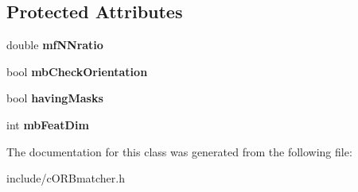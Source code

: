 \subsection*{Protected Attributes}
\begin{DoxyCompactItemize}
\item 
double {\bfseries mf\+N\+Nratio}\hypertarget{classMultiColSLAM_1_1cORBmatcher_a245c998d51b001aeae58ef86315be170}{}\label{classMultiColSLAM_1_1cORBmatcher_a245c998d51b001aeae58ef86315be170}

\item 
bool {\bfseries mb\+Check\+Orientation}\hypertarget{classMultiColSLAM_1_1cORBmatcher_a341d3d54041e8eebb463697c084ba2a1}{}\label{classMultiColSLAM_1_1cORBmatcher_a341d3d54041e8eebb463697c084ba2a1}

\item 
bool {\bfseries having\+Masks}\hypertarget{classMultiColSLAM_1_1cORBmatcher_ae5f0f1f2e7d5213fb21e9a6ef15bd297}{}\label{classMultiColSLAM_1_1cORBmatcher_ae5f0f1f2e7d5213fb21e9a6ef15bd297}

\item 
int {\bfseries mb\+Feat\+Dim}\hypertarget{classMultiColSLAM_1_1cORBmatcher_ae86173ab10991626a455c8e510e73189}{}\label{classMultiColSLAM_1_1cORBmatcher_ae86173ab10991626a455c8e510e73189}

\end{DoxyCompactItemize}


The documentation for this class was generated from the following file\+:\begin{DoxyCompactItemize}
\item 
include/c\+O\+R\+Bmatcher.\+h\end{DoxyCompactItemize}

